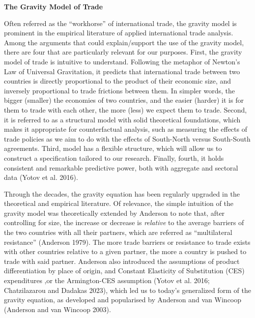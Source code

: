 \textbf{The Gravity Model of Trade}

Often referred as the ``workhorse'' of international trade, the gravity
model is prominent in the empirical literature of applied international
trade analysis. Among the arguments that could explain/support the use
of the gravity model, there are four that are particularly relevant for
our purposes. First, the gravity model of trade is intuitive to
understand. Following the metaphor of Newton's Law of Universal
Gravitation, it predicts that international trade between two countries
is directly proportional to the product of their economic size, and
inversely proportional to trade frictions between them. In simpler
words, the bigger (smaller) the economies of two countries, and the
easier (harder) it is for them to trade with each other, the more (less)
we expect them to trade. Second, it is referred to as a structural model
with solid theoretical foundations, which makes it appropriate for
counterfactual analysis, such as measuring the effects of trade policies
as we aim to do with the effects of South-North versus South-South
agreements. Third, model has a flexible structure, which will allow us
to construct a specification tailored to our research. Finally, fourth,
it holds consistent and remarkable predictive power, both with aggregate
and sectoral data (Yotov et al. 2016).

Through the decades, the gravity equation has been regularly upgraded in
the theoretical and empirical literature. Of relevance, the simple
intuition of the gravity model was theoretically extended by Anderson to
note that, after controlling for size, the increase or decrease is
\emph{relative} to the average barriers of the two countries with all
their partners, which are referred as ``multilateral resistance''
(Anderson 1979). The more trade barriers or resistance to trade exists
with other countries relative to a given partner, the more a country is
pushed to trade with said partner. Anderson also introduced the
assumptions of product differentiation by place of origin, and Constant
Elasticity of Substitution (CES) expenditures ,or the Armington-CES
assumption (Yotov et al. 2016; Chatzilazarou and Dadakas 2023), which
led us to today's generalized form of the gravity equation, as developed
and popularised by Anderson and van Wincoop (Anderson and van Wincoop
2003).

